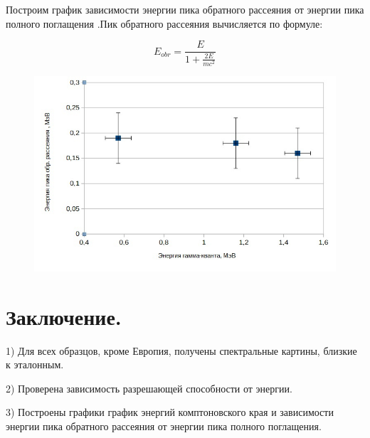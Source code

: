 \documentclass[%
 reprint,
 amsmath,amssymb,
 aps,
]{revtex4-2}
\begin{document}
 Построим график зависимости энергии пика обратного рассеяния от
 энергии пика полного поглащения .Пик обратного рассеяния вычисляется по формуле:
 
 \begin{equation}
 E_{obr} = \frac{E}{1 + \frac{2E}{mc^2}}
 \end{equation}
 
 \begin{figure}[h!]
 	\includegraphics[scale=0.5]{7.jpg}
 \end{figure}
 

\section{Заключение.}

1) Для всех образцов, кроме Европия, получены спектральные картины, близкие к эталонным.

2) Проверена зависимость разрешающей способности от энергии.

3) Построены графики график энергий комптоновского края и зависимости энергии пика обратного рассеяния от энергии пика полного поглащения.
\end{document}
